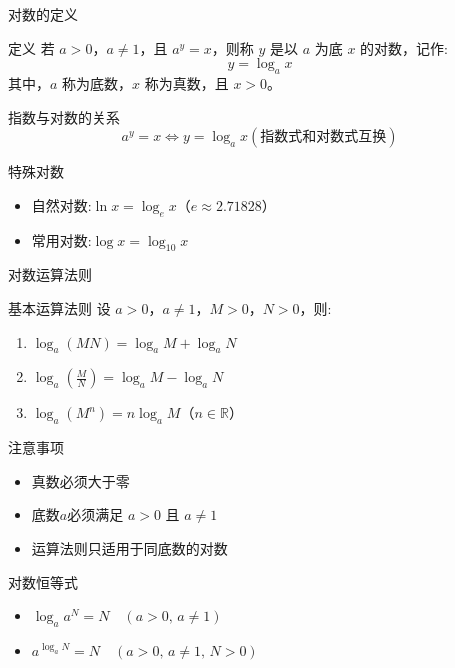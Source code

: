 
\begin{frame}{对数的定义}
    \begin{block}{定义}
        若 $a > 0$，$a \neq 1$，且 $a^y = x$，则称 $y$ 是以 $a$ 为底 $x$ 的对数，记作:
        \[
        y = \log_a x
        \]
        其中，$a$ 称为底数，$x$ 称为真数，且 $x > 0$。
    \end{block}
    
    \begin{alertblock}{指数与对数的关系}
        \[
        a^y = x \iff y = \log_a x (\text{指数式和对数式互换})
        \]
    \end{alertblock}
    
    \begin{exampleblock}{特殊对数}
        \begin{itemize}
            \item 自然对数:$\ln x = \log_e x$（$e \approx 2.71828$）
            \item 常用对数:$\log x = \log_{10} x$
        \end{itemize}
    \end{exampleblock}
  \end{frame}
  
  \begin{frame}{对数运算法则}
    \begin{block}{基本运算法则}
        设 $a > 0$，$a \neq 1$，$M > 0$，$N > 0$，则:
        \begin{enumerate}
            \item $\log_a(MN) = \log_a M + \log_a N$
            \item $\log_a\left(\frac{M}{N}\right) = \log_a M - \log_a N$
            \item $\log_a(M^n) = n \log_a M$（$n \in \mathbb{R}$）
        \end{enumerate}
    \end{block}
    
    \begin{alertblock}{注意事项}
        \begin{itemize}
            \item 真数必须大于零
            \item 底数$a$必须满足 $a > 0$ 且 $a \neq 1$
            \item 运算法则只适用于同底数的对数
        \end{itemize}
    \end{alertblock}
    \begin{block}{对数恒等式}
      \begin{itemize}
        \item     $\log_a a^N =N \quad (a > 0, \, a \neq 1)$
        \item     \(a^{\log_a N} = N \quad (a > 0, \, a \neq 1, \, N > 0)\)
    \end{itemize}
  
  \end{block}
  
  \end{frame}
  
